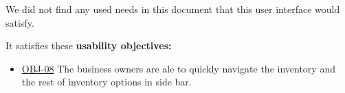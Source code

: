 \documentclass[]{VUMIFTemplateClass}
\begin{document}
We did not find any used needs in this document that this user interface would satisfy.

It satisfies these \textbf{usability objectives:}

\begin{itemize}
    \item \hyperref[OBJ-08]{OBJ-08} The business owners are ale to quickly navigate the inventory and the rest of inventory options in side bar.
\end{itemize}











\end{document}
